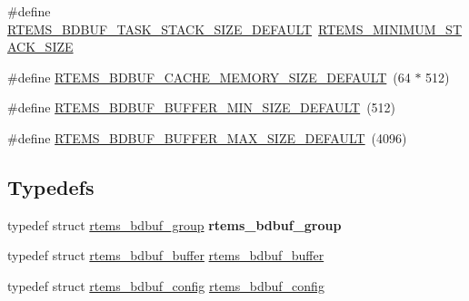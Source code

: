 \begin{DoxyCompactItemize}
\item 
\#define \mbox{\hyperlink{group__rtems__bdbuf_ga39a54490a2930a1a321c5b06cc5e3e54}{R\+T\+E\+M\+S\+\_\+\+B\+D\+B\+U\+F\+\_\+\+T\+A\+S\+K\+\_\+\+S\+T\+A\+C\+K\+\_\+\+S\+I\+Z\+E\+\_\+\+D\+E\+F\+A\+U\+LT}}~\mbox{\hyperlink{group__RTEMSAPIClassic_ga2e35188053c5e97a85df8e3aa4d23d2f}{R\+T\+E\+M\+S\+\_\+\+M\+I\+N\+I\+M\+U\+M\+\_\+\+S\+T\+A\+C\+K\+\_\+\+S\+I\+ZE}}
\item 
\#define \mbox{\hyperlink{group__rtems__bdbuf_ga2bb4bb2bf0d5333d78272725eab143f8}{R\+T\+E\+M\+S\+\_\+\+B\+D\+B\+U\+F\+\_\+\+C\+A\+C\+H\+E\+\_\+\+M\+E\+M\+O\+R\+Y\+\_\+\+S\+I\+Z\+E\+\_\+\+D\+E\+F\+A\+U\+LT}}~(64 $\ast$ 512)
\item 
\#define \mbox{\hyperlink{group__rtems__bdbuf_gaad496ebd5fc85425bc1d8545955051ca}{R\+T\+E\+M\+S\+\_\+\+B\+D\+B\+U\+F\+\_\+\+B\+U\+F\+F\+E\+R\+\_\+\+M\+I\+N\+\_\+\+S\+I\+Z\+E\+\_\+\+D\+E\+F\+A\+U\+LT}}~(512)
\item 
\#define \mbox{\hyperlink{group__rtems__bdbuf_ga3de9417ce0cc9bce90e924796c191cc2}{R\+T\+E\+M\+S\+\_\+\+B\+D\+B\+U\+F\+\_\+\+B\+U\+F\+F\+E\+R\+\_\+\+M\+A\+X\+\_\+\+S\+I\+Z\+E\+\_\+\+D\+E\+F\+A\+U\+LT}}~(4096)
\end{DoxyCompactItemize}
\subsection*{Typedefs}
\begin{DoxyCompactItemize}
\item 
\mbox{\label{group__rtems__bdbuf_gac1425c77af823674c78f853694284a44}} 
typedef struct \mbox{\hyperlink{structrtems__bdbuf__group}{rtems\+\_\+bdbuf\+\_\+group}} {\bfseries rtems\+\_\+bdbuf\+\_\+group}
\item 
typedef struct \mbox{\hyperlink{structrtems__bdbuf__buffer}{rtems\+\_\+bdbuf\+\_\+buffer}} \mbox{\hyperlink{group__rtems__bdbuf_gacce5a2661bea8023c1b5097f7566f051}{rtems\+\_\+bdbuf\+\_\+buffer}}
\item 
typedef struct \mbox{\hyperlink{structrtems__bdbuf__config}{rtems\+\_\+bdbuf\+\_\+config}} \mbox{\hyperlink{group__rtems__bdbuf_gaf4f5fc331dd33379471c78d5459c69f7}{rtems\+\_\+bdbuf\+\_\+config}}
\end{DoxyCompactItemize}
